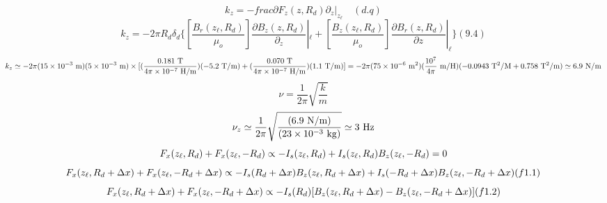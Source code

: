 \begin{equation}%
k_{z}=-frac{\partial F_{z}(z,R_{d})}{\partial_{z}}|_{z_{\ell}}\quad(d.q)
\end{equation}
\begin{equation}%
k_{z}=-2\pi R_{d}\delta_{d}\{[\frac{B_{r}(z_{\ell},R_{d})}{\mu_{o}}]\frac{\partial B_{z}(z,R_{d})}{\partial_{z}}|_{\ell}+[\frac{B_{z}(z_{\ell},R_{d})}{\mu_{o}}]\frac{\partial B_{r}(z,R_{d})}{\partial z}|_{\ell}\}(9.4)
\end{equation}
\begin{equation}%
k_{z}\simeq-2\pi(15\times10^{-3}\ \mathrm{m})(5\times10^{-3}\ \mathrm{m})\\
\times[(\frac{0.181\ \mathrm{T}}{4\pi\times10^{-7}\ \mathrm{H/m}})(-5.2\ \mathrm{T/m})+(\frac{0.070\ \mathrm{T}}{4\pi\times10^{-7}\ \mathrm{H/m}})(1.1\ \mathrm{T/m})]\\
=-2\pi(75\times10^{-6}\ \mathrm{m^{2}})(\frac{10^{7}}{4\pi}\ \mathrm{m/H})(-0.0943\ \mathrm{T^{2}/M}+0.758\ \mathrm{T^{2}/m})\\
\simeq6.9\ \mathrm{N/m}
\end{equation}
\begin{equation}%
\nu=\frac{1}{2\pi}\sqrt{\frac{k}{m}}
\end{equation}
\begin{equation}%
\nu_{z}\simeq\frac{1}{2\pi}\sqrt{\frac{(6.9\ \mathrm{N/m})}{(23\times10^{-3}\ \mathrm{kg})}}\\
\simeq3\ \mathrm{Hz}
\end{equation}
\begin{equation}%
F_{x}(z_{\ell},R_{d})+F_{x}(z_{\ell},-R_{d})\propto-I_{s}(z_{\ell},R_{d})+I_{s}(z_{\ell},R_{d})B_{z}(z_{\ell},-R_{d})\\
=0
\end{equation}
\begin{equation}%
F_{x}(z_{\ell},R_{d}+\Delta x)+F_{x}(z_{\ell},-R_{d}+\Delta x)\propto-I_{s}(R_{d}+\Delta x)B_{z}(z_{\ell},R_{d}+\Delta x)\\
+I_{s}(-R_{d}+\Delta x)B_{z}(z_{\ell},-R_{d}+\Delta x)(f1.1)
\end{equation}
\begin{equation}%
F_{x}(z_{\ell},R_{d}+\Delta x)+F_{x}(z_{\ell},-R_{d}+\Delta x)\propto-I_{s}(R_{d})[B_{z}(z_{\ell},R_{d}+\Delta x)\\
-B_{z}(z_{\ell},-R_{d}+\Delta x)](f1.2)
\end{equation}



